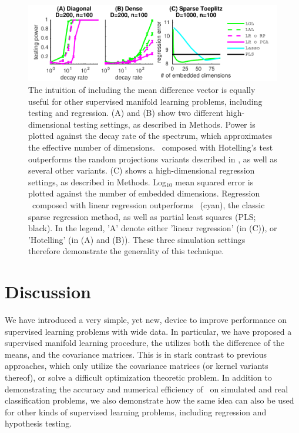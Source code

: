 \documentclass[10pt]{article}
\begin{document}
\begin{figure}
\centering
\includegraphics[width=1\linewidth]{../Figs/regression_power}
\caption{
The intuition of including the mean difference vector is equally useful for other supervised manifold learning problems, including testing and regression.
(A) and (B) show two different high-dimensional testing settings, as described in Methods.  Power is plotted against the decay rate of the spectrum, which approximates the effective number of dimensions.  \Lol~composed with Hotelling's test outperforms the random projections variants described in \cite{Lopes2011a}, as well as several other variants.
(C) shows a high-dimensional regression settings, as described in Methods.  Log$_{10}$ mean squared error is plotted against the number of embedded dimensions.  
Regression \Lol~composed with linear regression outperforms ~(cyan), the classic sparse regression method, as well as partial least squares (PLS; black).
In the legend, 'A' denote either 'linear regression' (in (C)), or 'Hotelling' (in (A) and (B)).
These three simulation settings therefore demonstrate the generality of this technique.
}
\label{fig:generalizations}
\end{figure}


\section*{Discussion}


We have introduced a very simple, yet new, device to improve performance on supervised learning problems with wide data.  In particular, we have proposed a supervised manifold learning procedure, the utilizes both the difference of the means, and the covariance matrices.  This is in stark contrast to previous approaches, which only utilize the covariance matrices (or kernel variants thereof), or solve a difficult optimization theoretic problem.  In addition to demonstrating the accuracy and numerical efficiency of \Lol~on simulated and real classification problems, we also demonstrate how the same idea can also be used for other kinds of supervised learning problems, including regression and hypothesis testing.
\end{document}

